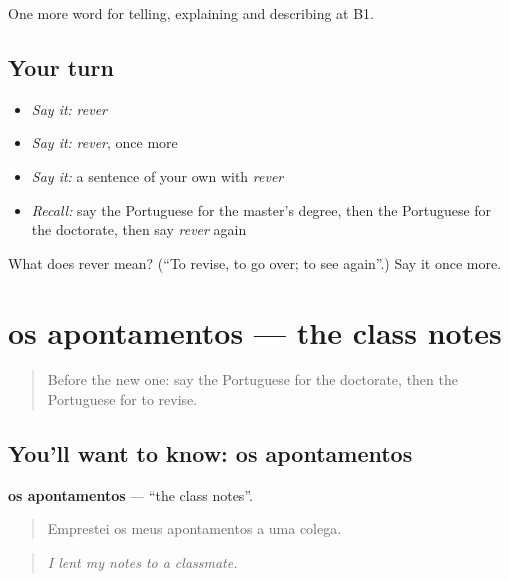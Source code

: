 \begin{grammarlens}[title={What you've built}]
One more word for telling, explaining and describing at B1.
\end{grammarlens}

\subsection*{Your turn}
\begin{itemize}
\raggedright
  \item \emph{Say it:} \emph{rever}
  \item \emph{Say it:} \emph{rever}, once more
  \item \emph{Say it:} a sentence of your own with \emph{rever}
  \item \emph{Recall:} say the Portuguese for the master's degree, then the Portuguese for the doctorate, then say \emph{rever} again
\end{itemize}

\begin{tcolorbox}[breakable,colback=teal!4,colframe=teal!35!black,title={Before you move on}]
What does rever mean? (\textquotedblleft{}To revise, to go over; to see again\textquotedblright{}.) Say it once more.
\end{tcolorbox}
\section[os apontamentos]{os apontamentos — the class notes}

\label{lesson:PT-C378-apontamentos}



\begin{quote}
Before the new one: say the Portuguese for the doctorate, then the Portuguese for to revise.
\end{quote}

\subsection*{You'll want to know: os apontamentos}
\textbf{os apontamentos} — \textquotedblleft{}the class notes\textquotedblright{}.

\begin{quote}
Emprestei os meus apontamentos a uma colega.
\end{quote}

\begin{quote}
\emph{I lent my notes to a classmate.}
\end{quote}


